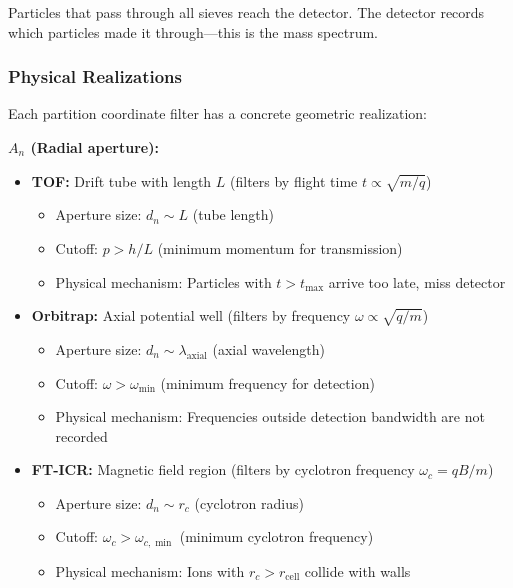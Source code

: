 Particles that pass through all sieves reach the detector. The detector records which particles made it through—this is the mass spectrum.

\subsubsection{Physical Realizations}

\begin{proposition}
\label{prop:aperture_realizations}
Each partition coordinate filter has a concrete geometric realization:

\textbf{$A_n$ (Radial aperture):}
\begin{itemize}
    \item \textbf{TOF:} Drift tube with length $L$ (filters by flight time $t \propto \sqrt{m/q}$)
        \begin{itemize}
        \item Aperture size: $d_n \sim L$ (tube length)
        \item Cutoff: $p > h/L$ (minimum momentum for transmission)
        \item Physical mechanism: Particles with $t > t_{\max}$ arrive too late, miss detector
        \end{itemize}
    
    \item \textbf{Orbitrap:} Axial potential well (filters by frequency $\omega \propto \sqrt{q/m}$)
        \begin{itemize}
        \item Aperture size: $d_n \sim \lambda_{\text{axial}}$ (axial wavelength)
        \item Cutoff: $\omega > \omega_{\min}$ (minimum frequency for detection)
        \item Physical mechanism: Frequencies outside detection bandwidth are not recorded
        \end{itemize}
    
    \item \textbf{FT-ICR:} Magnetic field region (filters by cyclotron frequency $\omega_c = qB/m$)
        \begin{itemize}
        \item Aperture size: $d_n \sim r_c$ (cyclotron radius)
        \item Cutoff: $\omega_c > \omega_{c,\min}$ (minimum cyclotron frequency)
        \item Physical mechanism: Ions with $r_c > r_{\text{cell}}$ collide with walls
        \end{itemize}
\end{itemize}


\end{proposition}
